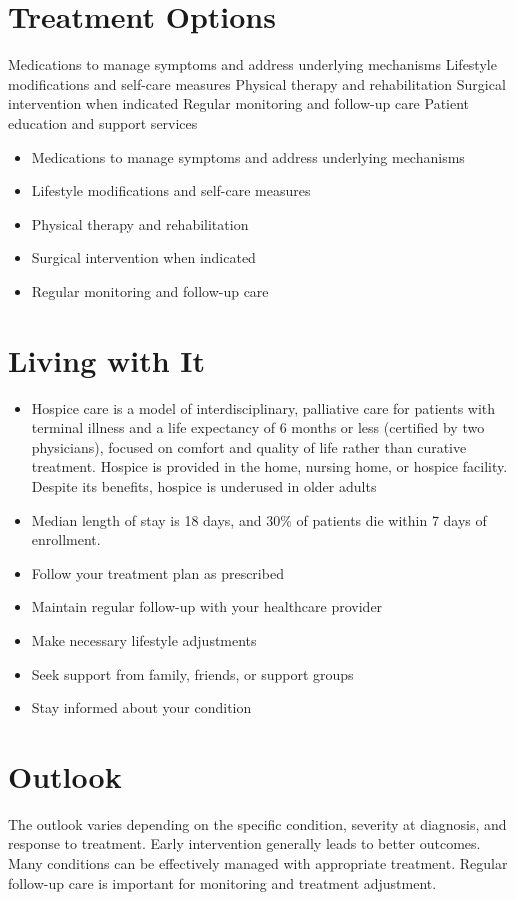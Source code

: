 \section{Treatment Options}
Medications to manage symptoms and address underlying mechanisms Lifestyle modifications and self-care measures Physical therapy and rehabilitation Surgical intervention when indicated Regular monitoring and follow-up care Patient education and support services

\begin{itemize}[noitemsep]
  \item Medications to manage symptoms and address underlying mechanisms
  \item Lifestyle modifications and self-care measures
  \item Physical therapy and rehabilitation
  \item Surgical intervention when indicated
  \item Regular monitoring and follow-up care
\end{itemize}
\section{Living with It}
\begin{itemize}[noitemsep]
  \item Hospice care is a model of interdisciplinary, palliative care for patients with terminal illness and a life expectancy of 6 months or less (certified by two physicians), focused on comfort and quality of life rather than curative treatment. Hospice is provided in the home, nursing home, or hospice facility. Despite its benefits, hospice is underused in older adults
  \item Median length of stay is 18 days, and 30\% of patients die within 7 days of enrollment.
  \item Follow your treatment plan as prescribed
  \item Maintain regular follow-up with your healthcare provider
  \item Make necessary lifestyle adjustments
  \item Seek support from family, friends, or support groups
  \item Stay informed about your condition
\end{itemize}
\section{Outlook}
The outlook varies depending on the specific condition, severity at diagnosis, and response to treatment. Early intervention generally leads to better outcomes. Many conditions can be effectively managed with appropriate treatment. Regular follow-up care is important for monitoring and treatment adjustment.
